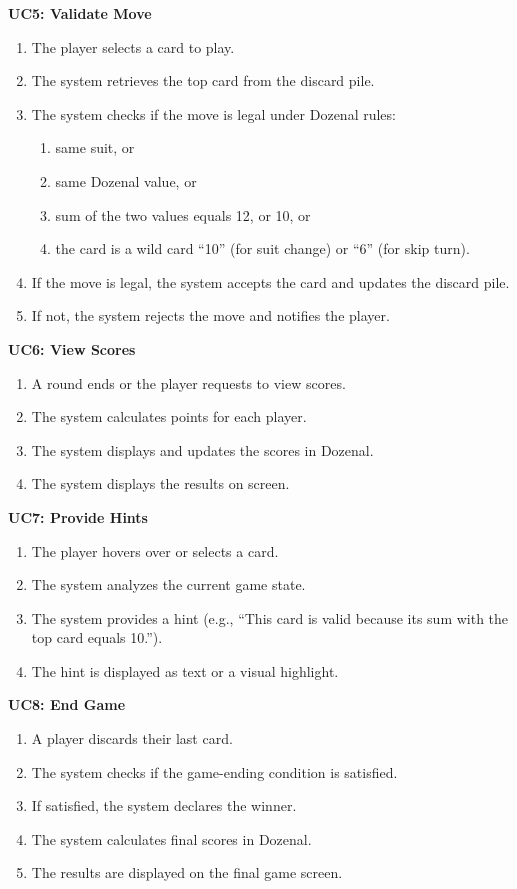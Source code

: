 \documentclass[12pt]{article}
\begin{document}
\noindent\textbf{UC5: Validate Move}
\begin{enumerate}
    \item The player selects a card to play.
    \item The system retrieves the top card from the discard pile.
    \item The system checks if the move is legal under Dozenal rules:
    \begin{enumerate}
        \item same suit, or
        \item same Dozenal value, or
        \item sum of the two values equals 12, or 10, or
        \item the card is a wild card ``10'' (for suit change) or ``6'' (for skip turn).
    \end{enumerate}
    \item If the move is legal, the system accepts the card and updates the discard pile.
    \item If not, the system rejects the move and notifies the player.
\end{enumerate}

\noindent\textbf{UC6: View Scores}
\begin{enumerate}
    \item A round ends or the player requests to view scores.
    \item The system calculates points for each player.
    \item The system displays and updates the scores in Dozenal.
    \item The system displays the results on screen.
\end{enumerate}

\noindent\textbf{UC7: Provide Hints}
\begin{enumerate}
    \item The player hovers over or selects a card.
    \item The system analyzes the current game state.
    \item The system provides a hint (e.g., ``This card is valid because its sum with the top card equals 10.'').
    \item The hint is displayed as text or a visual highlight.
\end{enumerate}

\noindent\textbf{UC8: End Game}
\begin{enumerate}
    \item A player discards their last card.
    \item The system checks if the game-ending condition is satisfied.
    \item If satisfied, the system declares the winner.
    \item The system calculates final scores in Dozenal.
    \item The results are displayed on the final game screen.
\end{enumerate}
\end{document}
